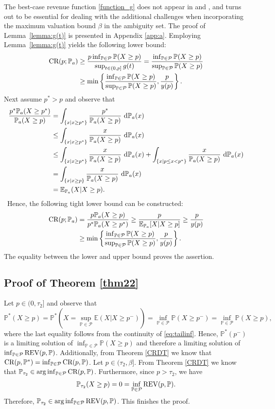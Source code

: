 \documentclass[11pt]{article}
\newcommand{\bP}{\mathbb{P}}
\newcommand{\cP}{\mathcal{P}}
\newcommand{\bE}{\mathbb{E}}
\newcommand{\1}{\mathds{1}}
\begin{document}
\noindent The best-case revenue function  \eqref{function_g} does not appear in 
\cite{chen2022distribution} and \cite{giannakopoulos2019robust}, and turns out to be essential for dealing with the additional challenges when incorporating the maximum valuation bound $\beta$ in the ambiguity set. 
The proof of Lemma~\ref{lemma:g(t)} is presented in Appendix \ref{app:a}. Employing Lemma~\ref{lemma:g(t)} yields the following lower bound:
\begin{align*}
    \textup{CR}(p;\bP_a) &\geq
    \frac{p\inf_{\bP \in \cP} \bP(X\geq p)}{\sup_{t \in (0,p]}g(t)} = \frac{\inf_{\bP \in \cP} \bP(X\geq p)}{\sup_{\bP \in \cP} \bP(X\geq p)}\\
    &\geq \min\left\{\frac{\inf_{\bP\in \cP}\bP(X\geq p)}{\sup_{\bP\in \cP}\bP(X\geq p)}, \frac{p}{y(p)}\right\}.
\end{align*}
 Next assume $p^* > p$ and observe that
\begin{align*}
\frac{p^* \bP_a(X \geq p^*)}{\bP_a(X \geq p)} &= \int_{\{x|x \geq p^*\}} \frac{p^*}{\bP_a(X \geq p)}\ {\rm d} \bP_a(x)\\
&\leq \int_{\{x|x \geq p^*\}} \frac{x}{\bP_a(X \geq p)}\ {\rm d} \bP_a(x)\\
&\leq \int_{\{x|x \geq p^*\}} \frac{x}{\bP_a(X \geq p)}\ {\rm d} \bP_a(x) + \int_{\{x|p \leq x < p^*\}} \frac{x}{\bP_a(X \geq p)}\ {\rm d} \bP_a(x)\\
&= \int_{\{x|x \geq p\}} \frac{x} {\bP_a(X \geq p)}\ {\rm d} \bP_a(x)\\
&= \bE_{\bP_a}(X|X \geq p).
\end{align*}\
\noindent Hence, the following tight lower bound can be constructed:
\begin{align*}
    \textup{CR}(p;\bP_a) &= \frac{p\bP_a(X \geq p)}{p^* \bP_a(X \geq p^*)} \geq
    \frac{p}{\bE_{\bP_a}[X|X \geq p]} \geq \frac{p}{y(p)}\\
    &\geq \min\left\{\frac{\inf_{\bP\in \cP}\bP(X\geq p)}{\sup_{\bP\in \cP}\bP(X\geq p)}, \frac{p}{y(p)}\right\}.
\end{align*}
The equality between the lower and upper bound proves the assertion.

\subsection{Proof of Theorem \ref{thm22}}
Let $p\in (0,\tau_2]$ and observe that $$\bP^*(X\geq p) = \bP^*(X=\sup_{\bP\in\cP}\bE(X|X\geq p^-)) = \inf_{\bP\in\cP}\bP(X\geq p^-) = \inf_{\bP\in\cP}\bP(X\geq p),$$ where the last equality follows from the continuity of \eqref{eq:tailinf}. Hence, $\bP^*(p^-)$ is a limiting solution of $\inf_{\bP\in\cP}\bP(X \geq p)$ and therefore a limiting solution of $\inf_{\bP\in\cP}\textup{REV}(p,\bP)$. Additionally, from Theorem \ref{CRDT} we know that $\textup{CR}(p,\bP^*) = \inf_{\bP\in\cP}\textup{CR}(p,\bP)$.
Let $p \in (\tau_2,\beta]$. From Theorem \ref{CRDT} we know that $\bP_{\tau_2} \in \arg\inf_{\bP\in\cP}\textup{CR}(p,\bP)$. Furthermore, since $p > \tau_2$, we have $$\bP_{\tau_2}(X\geq p) = 0 = \inf_{\bP\in\cP}\textup{REV}(p,\bP).$$ Therefore, $\bP_{\tau_2} \in \arg\inf_{\bP\in\cP}\textup{REV}(p,\bP)$. This finishes the proof.
\end{document}
